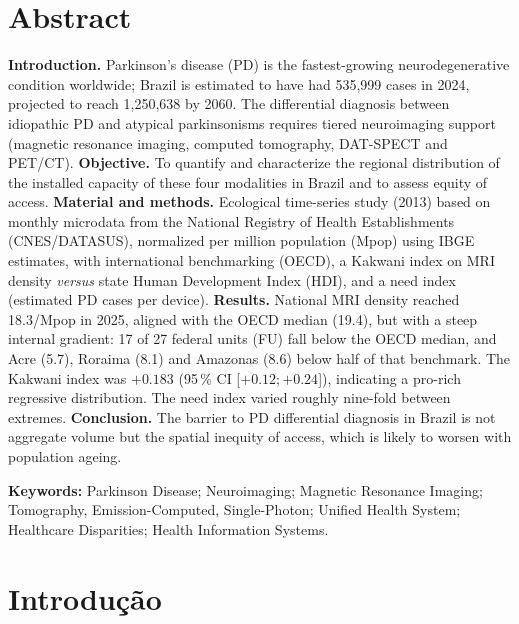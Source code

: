 \documentclass[12pt,a4paper,oneside]{article}
\begin{document}
\section*{Abstract}
\begin{singlespace}\small\noindent
\textbf{Introduction.} Parkinson's disease (PD) is the fastest-growing
neurodegenerative condition worldwide; Brazil is estimated to have had
535,999 cases in 2024, projected to reach 1,250,638 by 2060. The
differential diagnosis between idiopathic PD and atypical parkinsonisms
requires tiered neuroimaging support (magnetic resonance imaging,
computed tomography, DAT-SPECT and PET/CT). \textbf{Objective.} To
quantify and characterize the regional distribution of the installed
capacity of these four modalities in Brazil and to assess equity of
access. \textbf{Material and methods.} Ecological time-series study
(2013) based on monthly microdata from the National
Registry of Health Establishments (CNES/DATASUS), normalized per
million population (Mpop) using IBGE estimates, with international
benchmarking (OECD), a Kakwani index on MRI density \textit{versus}
state Human Development Index (HDI), and a need index (estimated PD
cases per device). \textbf{Results.} National MRI density reached
18.3/Mpop in 2025, aligned with the OECD median (19.4), but with a
steep internal gradient: 17 of 27 federal units (FU) fall below the
OECD median, and Acre (5.7), Roraima (8.1) and Amazonas (8.6) below
half of that benchmark. The Kakwani index was $+0.183$
(95\,\% CI [$+0.12;+0.24$]), indicating a pro-rich regressive
distribution. The need index varied roughly nine-fold between
extremes. \textbf{Conclusion.} The barrier to PD differential
diagnosis in Brazil is not aggregate volume but the spatial inequity
of access, which is likely to worsen with population ageing.

\vspace{0.35cm}\noindent\textbf{Keywords:} Parkinson Disease;
Neuroimaging; Magnetic Resonance Imaging; Tomography, Emission-Computed,
Single-Photon; Unified Health System; Healthcare Disparities; Health
Information Systems.
\end{singlespace}

\newpage

\section{Introdução}
\end{document}
